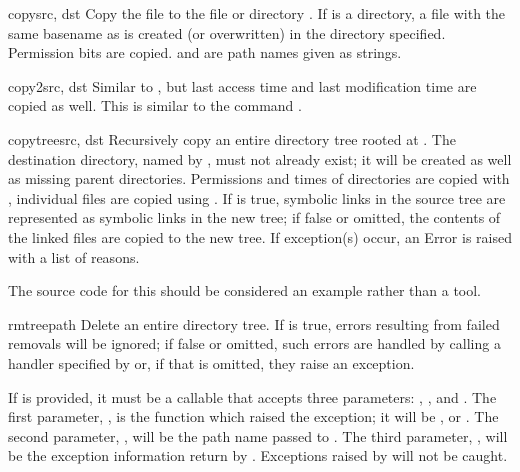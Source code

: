 \begin{funcdesc}{copy}{src, dst}
  Copy the file  to the file or directory .  If
   is a directory, a file with the same basename as  
  is created (or overwritten) in the directory specified.  Permission
  bits are copied.   and  are path names given as
  strings.
\end{funcdesc}

\begin{funcdesc}{copy2}{src, dst}
  Similar to , but last access time and last
  modification time are copied as well.  This is similar to the
  \UNIX{} command  .
\end{funcdesc}

\begin{funcdesc}{copytree}{src, dst}
  Recursively copy an entire directory tree rooted at .  The
  destination directory, named by , must not already exist;
  it will be created as well as missing parent directories.
  Permissions and times of directories are copied with ,
  individual files are copied using .  
  If  is true, symbolic links in
  the source tree are represented as symbolic links in the new tree;
  if false or omitted, the contents of the linked files are copied to
  the new tree.  If exception(s) occur, an Error is raised
  with a list of reasons.

  The source code for this should be considered an example rather than 
  a tool.



\end{funcdesc}

\begin{funcdesc}{rmtree}{path}
  Delete an entire directory tree.
  If  is true,
  errors resulting from failed removals will be ignored; if false or
  omitted, such errors are handled by calling a handler specified by
   or, if that is omitted, they raise an exception.

  If  is provided, it must be a callable that accepts
  three parameters: , , and .
  The first parameter, , is the function which raised
  the exception; it will be ,  or
  .  The second parameter, , will be
  the path name passed to .  The third parameter,
  , will be the exception information return by
  .  Exceptions raised by  will
  not be caught.
\end{funcdesc}

